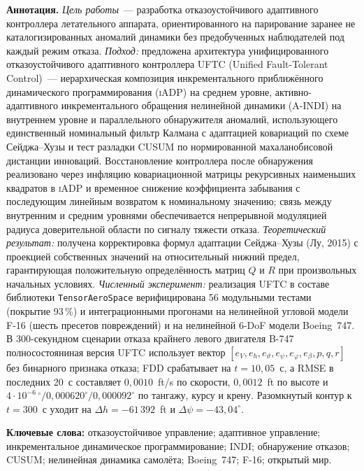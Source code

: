 \documentclass[a4paper,14pt]{extarticle}
\newcommand{\UFTC}{\textsc{UFTC}}
\newcommand{\IADP}{\textsc{iADP}}
\newcommand{\AINDI}{\textsc{A-INDI}}
\newcommand{\FDD}{\textsc{FDD}}
\newcommand{\degr}{^{\circ}}
\begin{document}
\noindent\textbf{Аннотация.}
\emph{Цель работы}~--- разработка отказоустойчивого адаптивного контроллера летательного аппарата, ориентированного на парирование заранее не каталогизированных аномалий динамики без предобученных наблюдателей под каждый режим отказа. \emph{Подход:} предложена архитектура унифицированного отказоустойчивого адаптивного контроллера \UFTC{} (Unified Fault-Tolerant Control)~--- иерархическая композиция инкрементального приближённого динамического программирования (\IADP{}) на среднем уровне, активно-адаптивного инкрементального обращения нелинейной динамики (\AINDI{}) на внутреннем уровне и параллельного обнаружителя аномалий, использующего единственный номинальный фильтр Калмана с адаптацией ковариаций по схеме Сейджа--Хузы и тест разладки CUSUM по нормированной махаланобисовой дистанции инноваций. Восстановление контроллера после обнаружения реализовано через инфляцию ковариационной матрицы рекурсивных наименьших квадратов в \IADP{} и временное снижение коэффициента забывания с последующим линейным возвратом к номинальному значению; связь между внутренним и средним уровнями обеспечивается непрерывной модуляцией радиуса доверительной области по сигналу тяжести отказа. \emph{Теоретический результат:} получена корректировка формул адаптации Сейджа--Хузы (Лу, 2015) с проекцией собственных значений на относительный нижний предел, гарантирующая положительную определённость матриц $Q$ и $R$ при произвольных начальных условиях. \emph{Численный эксперимент:} реализация \UFTC{} в составе библиотеки \texttt{TensorAeroSpace} верифицирована 56 модульными тестами (покрытие 93\,\%) и интеграционными прогонами на нелинейной угловой модели F-16 (шесть пресетов повреждений) и на нелинейной 6-DoF модели Boeing~747. В 300-секундном сценарии отказа крайнего левого двигателя B-747 полносостояниная версия \UFTC{} использует вектор $[e_V,e_h,e_{\vartheta},e_{\psi},e_{\varphi},e_{\beta},p,q,r]$ без бинарного признака отказа; \FDD{} срабатывает на $t=10{,}05$~с, а RMSE в последних 20~с составляет $0{,}0010$~ft/s по скорости, $0{,}0012$~ft по высоте и $4\cdot10^{-6}\,\degr/0{,}000620\degr/0{,}000092\degr$ по тангажу, курсу и крену. Разомкнутый контур к $t=300$~с уходит на $\Delta h=-61\,392$~ft и $\Delta\psi=-43{,}04\degr$.

\medskip
\noindent\textbf{Ключевые слова:}
отказоустойчивое управление; адаптивное управление; инкрементальное динамическое программирование; INDI; обнаружение отказов; CUSUM; нелинейная динамика самолёта; Boeing~747; F-16; открытый мир.
\end{document}
